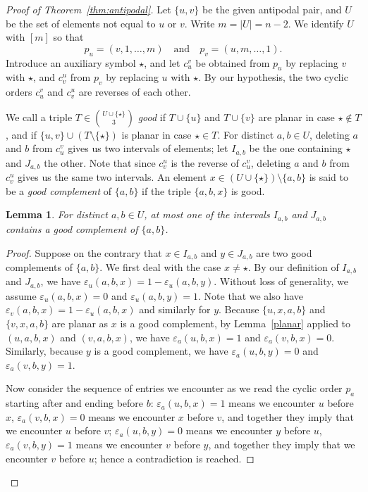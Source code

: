 \documentclass{article}
\theoremstyle{plain}
\newtheorem{lemma}[theorem]{Lemma}
\theoremstyle{definition}
\theoremstyle{remark}
\begin{document}
\begin{proof}[Proof of Theorem~\ref{thm:antipodal}]
Let \(\{u,v\}\) be the given antipodal pair, and
\(U\) be the set of elements not equal to \(u\) or \(v\). Write \(m=|U|=n-2\). We identify \(U\)
with \([m]\) so that
\[
p_u=(v,1,\ldots,m)
\quad\text{and}\quad
p_v=(u,m,\ldots,1).
\]
Introduce an auxiliary symbol \(\star\), and let \(c_u^v\) be obtained
from \(p_u\) by replacing \(v\) with \(\star\), and \(c_v^u\) from
\(p_v\) by replacing \(u\) with \(\star\). By our hypothesis, the two cyclic orders \(c_u^v\) and \(c_v^u\) are reverses of each other.

We call a triple \(T\in\binom{U\cup\{\star\}}3\) \emph{good} if
\(T\cup\{u\}\) and \(T\cup\{v\}\) are planar in case
\(\star\notin T\), and if \(\{u,v\}\cup(T\setminus\{\star\})\) is
planar in case \(\star\in T\). For distinct \(a,b\in U\), deleting \(a\) and \(b\) from \(c_u^v\) gives us two intervals of elements; let \(I_{a,b}\) be the one containing \(\star\) and
\(J_{a,b}\) the other. Note that since \(c_v^u\) is the reverse of \(c_u^v\), deleting \(a\) and \(b\) from \(c_v^u\) gives us the same two intervals. An element \(x \in (U\cup\{\star\}) \setminus \{a,b\}\) is said to be a \emph{good complement} of \(\{a,b\}\) if the triple \(\{a,b,x\}\) is good.

\begin{lemma}\label{lem:good-interval}
For distinct \(a,b\in U\), at most one of the intervals \(I_{a,b}\) and \(J_{a,b}\) contains a good complement of \(\{a,b\}\).
\end{lemma}

\begin{proof}

Suppose on the contrary that \(x \in I_{a,b}\) and \(y \in J_{a,b}\) are two good complements of \(\{a,b\}\). We first deal with the case \(x \neq \star\). By our definition of \(I_{a,b}\) and \(J_{a,b}\), we have \(\varepsilon_u(a,b,x) = 1 - \varepsilon_u(a,b,y)\). Without loss of generality, we assume \(\varepsilon_u(a,b,x) = 0\) and \(\varepsilon_u(a,b,y) = 1\). Note that we also have \(\varepsilon_v(a,b,x) = 1 -\varepsilon_u(a,b,x)\) and similarly for \(y\). Because \(\{u,x,a,b\}\) and \(\{v,x,a,b\}\) are planar as \(x\) is a good complement, by Lemma~\ref{planar} applied to \((u,a,b,x)\) and \((v,a,b,x)\), we have \(\varepsilon_a(u,b,x)=1\) and \(\varepsilon_a(v,b,x)=0\). Similarly, because \(y\) is a good complement, we have \(\varepsilon_a(u,b,y)=0\) and \(\varepsilon_a(v,b,y)=1\).

Now consider the sequence of entries we encounter as we read the cyclic order \(p_a\) starting after and ending before \(b\): \(\varepsilon_a(u,b,x)=1\) means we encounter \(u\) before \(x\), \(\varepsilon_a(v,b,x)=0\) means we encounter \(x\) before \(v\), and together they imply that we encounter \(u\) before \(v\);  \(\varepsilon_a(u,b,y)=0\) means we encounter \(y\) before \(u\), \(\varepsilon_a(v,b,y)=1\) means we encounter \(v\) before \(y\), and together they imply that we encounter \(v\) before \(u\); hence a contradiction is reached.


\end{proof}
\end{proof}
\end{document}
